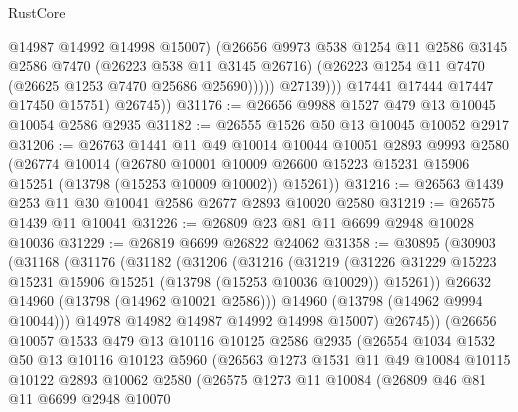 \begin{lexlean}{RustCore}
\begin{coremodule}
                      @14987
                      @14992
                      @14998
                      @15007)
                    (@26656
                      @9973
                      @538
                      @1254
                      @11
                      @2586
                      @3145
                      @2586
                      @7470
                      (@26223 @538 @11 @3145 @26716)
                      (@26223 @1254 @11 @7470 (@26625 @1253 @7470 @25686 @25690)))))
                @27139)))
          @17441
          @17444
          @17447
          @17450
          @15751)
        @26745))
@31176 := @26656 @9988 @1527 @479 @13 @10045 @10054 @2586 @2935
@31182 := @26555 @1526 @50 @13 @10045 @10052 @2917
@31206 := @26763
    @1441
    @11
    @49
    @10014
    @10044
    @10051
    @2893
    @9993
    @2580
    (@26774
      @10014
      (@26780
        @10001
        @10009
        @26600
        @15223
        @15231
        @15906
        @15251
        (@13798 (@15253 @10009 @10002))
        @15261))
@31216 := @26563 @1439 @253 @11 @30 @10041 @2586 @2677 @2893 @10020 @2580
@31219 := @26575 @1439 @11 @10041
@31226 := @26809 @23 @81 @11 @6699 @2948 @10028 @10036
@31229 := @26819 @6699 @26822 @24062
@31358 := @30895
    (@30903
      (@31168
        (@31176
          (@31182
            (@31206
              (@31216
                (@31219
                  (@31226
                    @31229
                    @15223
                    @15231
                    @15906
                    @15251
                    (@13798 (@15253 @10036 @10029))
                    @15261))
                @26632
                @14960
                (@13798 (@14962 @10021 @2586)))
              @14960
              (@13798 (@14962 @9994 @10044)))
            @14978
            @14982
            @14987
            @14992
            @14998
            @15007)
          @26745))
      (@26656
        @10057
        @1533
        @479
        @13
        @10116
        @10125
        @2586
        @2935
        (@26554
          @1034
          @1532
          @50
          @13
          @10116
          @10123
          @5960
          (@26563
            @1273
            @1531
            @11
            @49
            @10084
            @10115
            @10122
            @2893
            @10062
            @2580
            (@26575
              @1273
              @11
              @10084
              (@26809
                @46
                @81
                @11
                @6699
                @2948
                @10070

\end{coremodule}
\end{lexlean}

